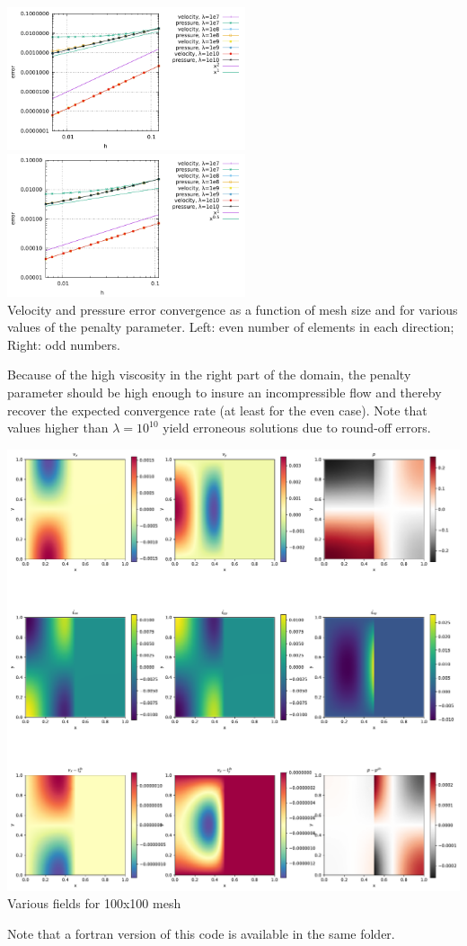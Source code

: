 \begin{center}
\includegraphics[width=7cm]{python_codes/fieldstone_05/results/errors_even.pdf}
\includegraphics[width=7cm]{python_codes/fieldstone_05/results/errors_odd.pdf}\\
{\captionfont Velocity and pressure error convergence as a function of mesh size and for various values
of the penalty parameter. Left: even number of elements in each direction; Right: odd numbers.
}
\end{center}

Because of the high viscosity in the right part of the domain, the penalty parameter should 
be high enough to insure an incompressible flow and thereby recover the expected convergence rate
(at least for the even case). Note that values higher than $\lambda=10^{10}$ yield erroneous solutions 
due to round-off errors. 

\begin{center}
\includegraphics[width=16cm]{python_codes/fieldstone_05/results/solution.pdf}
{\captionfont Various fields for 100x100 mesh}
\end{center}

Note that a fortran version of this code is available in the same folder.


